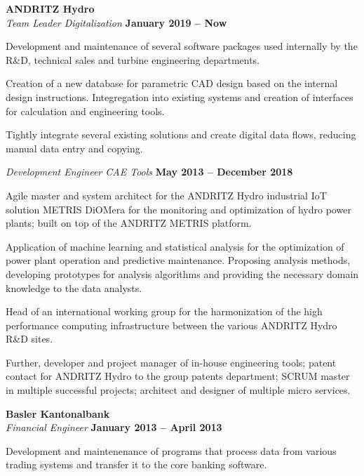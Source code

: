 \documentclass[line,11pt,a4paper]{../resume}
\begin{document}
\begin{resume}
\textbf{ANDRITZ Hydro}\\\vspace{1mm}%
\textsl{Team Leader Digitalization} \hfill \textbf{January 2019 -- Now}\\
\vspace{-4mm}%
\begin{list2}
  \item Development and maintenance of several software packages used
    internally by the R\&D, technical sales and turbine engineering
    departments.
  \item Creation of a new database for parametric CAD design based on the
    internal design instructions. Integregation into existing systems and
    creation of interfaces for calculation and engineering tools.
  \item Tightly integrate several existing solutions and create digital
    data flows, reducing manual data entry and copying.
\end{list2}

\textsl{Development Engineer CAE Tools} \hfill \textbf{May 2013 -- December 2018}\\
\vspace{-4mm}%
\begin{list2}
  \item Agile master and system architect for the ANDRITZ Hydro industrial IoT
    solution METRIS DiOMera for the monitoring and optimization of hydro
    power plants; built on top of the ANDRITZ METRIS platform.

  \item Application of machine learning and statistical analysis for the
    optimization of power plant operation and predictive maintenance.
    Proposing analysis methods, developing prototypes for analysis algorithms
    and providing the necessary domain knowledge to the data analysts.

  \item Head of an international working group for the harmonization of the
    high performance computing infrastructure between the various ANDRITZ Hydro
    R\&D sites.

  \item Further, developer and project manager of in-house engineering tools;
    patent contact for ANDRITZ Hydro to the group patents department; SCRUM
    master in multiple successful projects; architect and designer of multiple
    micro services.
 \end{list2}

\textbf{Basler Kantonalbank}\\\vspace{1mm}%
\textsl{Financial Engineer} \hfill \textbf{January 2013 -- April 2013}\\
\vspace{-4mm}%
\begin{list2}
  \item Development and maintenenance of programs that process data from
    various trading systems and transfer it to the core banking software.
\end{list2}


\end{resume}
\end{document}
